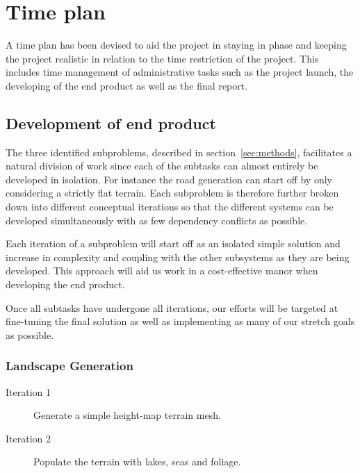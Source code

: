 \section{Time plan}

A time plan has been devised to aid the project in staying in phase and keeping the project realistic in relation to the time restriction of the project.
This includes time management of administrative tasks such as the project launch, the developing of the end product as well as the final report.

\subsection{Development of end product}
The three identified subproblems, described in section~\ref{sec:methods}, facilitates a natural division of work since each of the subtasks can almost entirely be developed in isolation.
For instance the road generation can start off by only considering a strictly flat terrain.
Each subproblem is therefore further broken down into different conceptual iterations so that the different systems can be developed simultaneously with as few dependency conflicts as possible.

Each iteration of a subproblem will start off as an isolated simple solution and increase in complexity and coupling with the other subsystems as they are being developed.
This approach will aid us work in a cost-effective manor when developing the end product.

Once all subtasks have undergone all iterations, our efforts will be targeted at fine-tuning the final solution as well as implementing as many of our stretch goals as possible.

\subsubsection{Landscape Generation}
\begin{description}
  \item[Iteration 1] Generate a simple height-map terrain mesh.
  \item[Iteration 2] Populate the terrain with lakes, seas and foliage.
\end{description}

